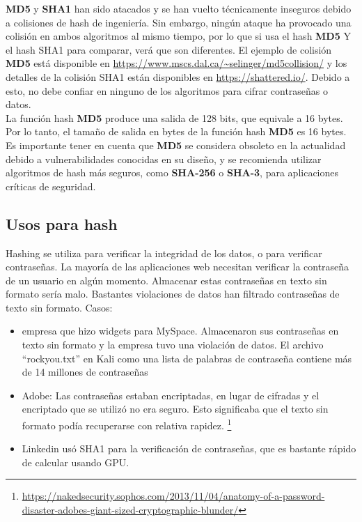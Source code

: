 \begin{tcolorbox}[colback=gray!5!white,colframe=orange!60!gray,title=¿Usamos hashing para encriptar llaves?] 
\textbf{MD5} y \textbf{SHA1} han sido atacados y se han vuelto técnicamente inseguros debido a colisiones de hash de ingeniería. Sin embargo, ningún ataque ha provocado una colisión en ambos algoritmos al mismo tiempo, por lo que si usa el hash \textbf{MD5} Y el hash SHA1 para comparar, verá que son diferentes. El ejemplo de colisión \textbf{MD5} está disponible en  \url{https://www.mscs.dal.ca/~selinger/md5collision/} y los detalles de la colisión SHA1 están disponibles en  \url{https://shattered.io/}. Debido a esto, no debe confiar en ninguno de los algoritmos para cifrar contraseñas o datos.\\
La función hash \textbf{MD5} produce una salida de 128 bits, que equivale a 16 bytes. Por lo tanto, el tamaño de salida en bytes de la función hash \textbf{MD5} es 16 bytes. Es importante tener en cuenta que \textbf{MD5} se considera obsoleto en la actualidad debido a vulnerabilidades conocidas en su diseño, y se recomienda utilizar algoritmos de hash más seguros, como \textbf{SHA-256} o \textbf{SHA-3}, para aplicaciones críticas de seguridad.\\
\end{tcolorbox}







\subsection{Usos para hash}
Hashing se utiliza para verificar la integridad de los datos, o para verificar contraseñas. La mayoría de las aplicaciones web necesitan verificar la contraseña de un usuario en algún momento. Almacenar estas contraseñas en texto sin formato sería malo. Bastantes violaciones de datos han filtrado contraseñas de texto sin formato. Casos:
\begin{itemize}
    
\item  empresa que hizo widgets para MySpace. Almacenaron sus contraseñas en texto sin formato y la empresa tuvo una violación de datos. El archivo ``rockyou.txt'' en Kali como una lista de palabras de contraseña contiene más de 14 millones de contraseñas 

\item Adobe: Las contraseñas estaban encriptadas, en lugar de cifradas y el encriptado que se utilizó no era seguro. Esto significaba que el texto sin formato podía recuperarse con relativa rapidez.  \footnote{\url{https://nakedsecurity.sophos.com/2013/11/04/anatomy-of-a-password-disaster-adobes-giant-sized-cryptographic-blunder/}}

\item Linkedin usó SHA1 para la verificación de contraseñas, que es bastante rápido de calcular usando GPU. 

\end{itemize}

